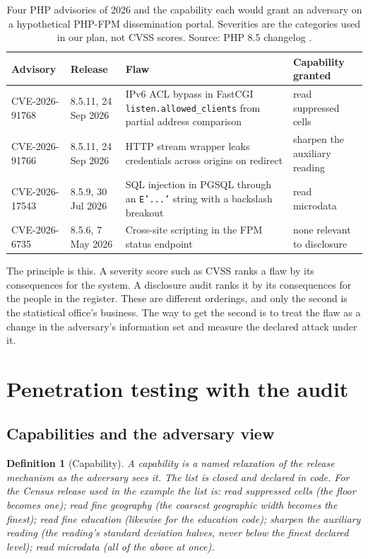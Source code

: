 \documentclass[11pt,a4paper]{article}
\newtheorem{definition}{Definition}
\begin{document}
\begin{table}[htbp]
\centering\small
\caption{Four PHP advisories of 2026 and the capability each would grant an adversary on a hypothetical PHP-FPM dissemination portal. Severities are the categories used in our plan, not CVSS scores. Source: PHP 8.5 changelog \citep{phpchangelog}.}
\label{tab:php}
\begin{tabular}{llp{52mm}l}
\toprule
Advisory & Release & Flaw & Capability granted \\
\midrule
CVE-2026-91768 & 8.5.11, 24 Sep 2026 & IPv6 ACL bypass in FastCGI \texttt{listen.allowed\_clients} from partial address comparison & read suppressed cells \\
CVE-2026-91766 & 8.5.11, 24 Sep 2026 & HTTP stream wrapper leaks credentials across origins on redirect & sharpen the auxiliary reading \\
CVE-2026-17543 & 8.5.9, 30 Jul 2026 & SQL injection in PGSQL through an \texttt{E'...'} string with a backslash breakout & read microdata \\
CVE-2026-6735 & 8.5.6, 7 May 2026 & Cross-site scripting in the FPM status endpoint & none relevant to disclosure \\
\bottomrule
\end{tabular}
\end{table}

The principle is this. A severity score such as CVSS ranks a flaw by its consequences for the system. A disclosure audit ranks it by its consequences for the people in the register. These are different orderings, and only the second is the statistical office's business. The way to get the second is to treat the flaw as a change in the adversary's information set and measure the declared attack under it.

\section{Penetration testing with the audit}\label{sec:pentest}

\subsection{Capabilities and the adversary view}
\begin{definition}[Capability]
A capability is a named relaxation of the release mechanism as the adversary sees it. The list is closed and declared in code. For the Census release used in the example the list is: read suppressed cells (the floor becomes one); read fine geography (the coarsest geographic width becomes the finest); read fine education (likewise for the education code); sharpen the auxiliary reading (the reading's standard deviation halves, never below the finest declared level); read microdata (all of the above at once).
\end{definition}
\end{document}
